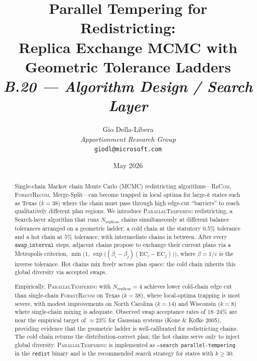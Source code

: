 \documentclass[12pt]{article}
\title{%
  \textbf{Parallel Tempering for Redistricting:}\\
  \textbf{Replica Exchange MCMC with Geometric Tolerance Ladders}\\[0.8em]
  \normalsize\textit{B.20 --- Algorithm Design / Search Layer}%
}
\author{%
  Gio Della-Libera\\
  \textit{Apportionment Research Group}\\
  \small\texttt{giodl@microsoft.com}
}
\date{May 2026}
\newcommand{\pt}{\textsc{ParallelTempering}}
\newcommand{\fr}{\textsc{ForestRecom}}
\newcommand{\recom}{\textsc{ReCom}}
\newcommand{\EC}{\mathrm{EC}}
\begin{document}
\maketitle

\begin{abstract}
\noindent
Single-chain Markov chain Monte Carlo (MCMC) redistricting algorithms---\recom{},
\fr{}, Merge-Split---can become trapped in local optima for large-$k$ states
such as Texas ($k=38$) where the chain must pass through high edge-cut
``barriers'' to reach qualitatively different plan regions.
We introduce \pt{} redistricting, a Search-layer algorithm that runs
$N_{\mathrm{replicas}}$ chains simultaneously at different balance tolerances
arranged on a geometric ladder: a cold chain at the statutory $0.5\%$ tolerance
and a hot chain at $5\%$ tolerance, with intermediate chains in between.
After every $\mathtt{swap\_interval}$ steps, adjacent chains propose to
exchange their current plans via a Metropolis criterion,
$\min\!\bigl(1,\, \exp\bigl((\beta_i - \beta_j)(\EC_i - \EC_j)\bigr)\bigr)$,
where $\beta = 1/\varepsilon$ is the inverse tolerance.
Hot chains mix freely across plan space; the cold chain inherits this global
diversity via accepted swaps.

Empirically, \pt{} with $N_{\mathrm{replicas}} = 4$ achieves lower cold-chain
edge cut than single-chain \fr{} on Texas ($k=38$), where local-optima
trapping is most severe, with modest improvements on North Carolina ($k=14$)
and Wisconsin ($k=8$) where single-chain mixing is adequate.
Observed swap acceptance rates of $18$--$24\%$ are near the empirical
target of ${\approx}23\%$ for Gaussian systems (Kone \& Kofke 2005),
providing evidence that the geometric ladder is well-calibrated for redistricting
chains.
The cold chain returns the distribution-correct plan; the hot chains serve
only to inject global diversity.
\pt{} is implemented as \texttt{--search parallel-tempering} in the
\texttt{redist} binary and is the recommended search strategy for states
with $k \ge 30$.
\end{abstract}

\tableofcontents
\newpage










\end{document}
